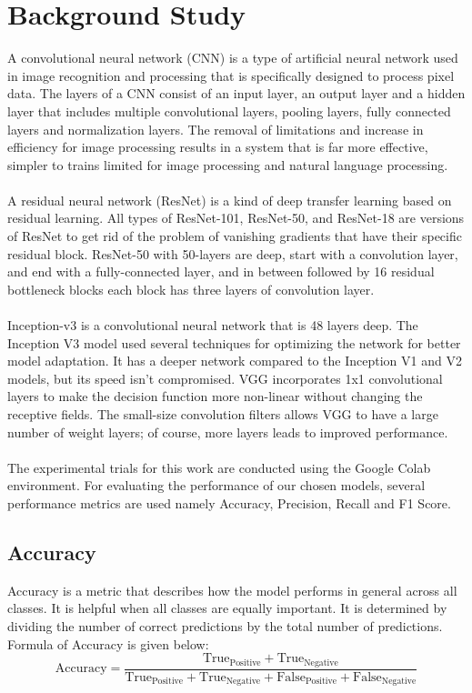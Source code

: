 \documentclass[conference]{IEEEtran}
\begin{document}
\section{Background Study}
A convolutional neural network (CNN) is a type of artificial neural network used in image recognition and processing that is specifically designed to process pixel data. The layers of a CNN consist of an input layer, an output layer and a hidden layer that includes multiple convolutional layers, pooling layers, fully connected layers and normalization layers. The removal of limitations and increase in efficiency for image processing results in a system that is far more effective, simpler to trains limited for image processing and natural language processing.
\\
\\
A residual neural network (ResNet) is a kind of deep transfer learning based on residual learning. All types of ResNet-101, ResNet-50, and ResNet-18 are versions of ResNet to get rid of the problem of vanishing gradients that have their specific residual block. ResNet-50 with 50-layers are deep, start with a convolution layer, and end with a fully-connected layer, and in between followed by 16 residual bottleneck blocks each block has three layers of convolution layer.
\\
\\
Inception-v3 is a convolutional neural network that is 48 layers deep. The Inception V3 model used several techniques for optimizing the network for better model adaptation. It has a deeper network compared to the Inception V1 and V2 models, but its speed isn't compromised. 
VGG incorporates 1x1 convolutional layers to make the decision function more non-linear without changing the receptive fields. The small-size convolution filters allows VGG to have a large number of weight layers; of course, more layers leads to improved performance.
\\
\\
The experimental trials for this work are conducted using the Google Colab environment. For evaluating the performance of our chosen models, several performance metrics are used namely Accuracy, Precision, Recall and F1 Score.

\subsection{Accuracy}
Accuracy is a metric that describes how the model performs in general across all classes. It is helpful when all classes are equally important. It is determined by dividing the number of correct predictions by the total number of predictions. Formula of Accuracy is given below:
{\begin{equation*}
    \text{Accuracy} = \frac{\text{True}_{\text{Positive}}+\text{True}_{\text{Negative}}}{\text{True}_{\text{Positive}}+\text{True}_{\text{Negative}}+\text{False}_{\text{Positive}}+\text{False}_{\text{Negative}}}
\end{equation*}}
\end{document}
